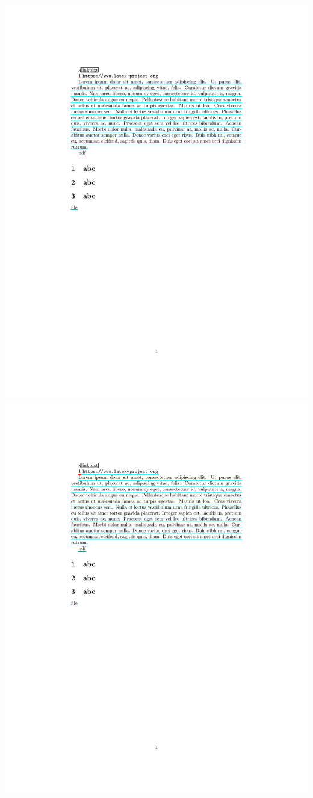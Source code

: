 \documentclass{article}
\begin{document}
\includegraphics[scale=0.5,trim=4cm 15cm 8cm 3cm,clip,page=1]{pax-input}
\includegraphics[scale=0.5,trim=5cm 15cm 8cm 3cm,clip,page=2]{pax-input}
\end{document}
